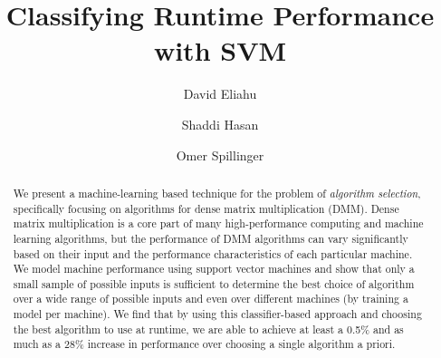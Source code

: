 \documentclass[10pt]{article}
\title{Classifying Runtime Performance with SVM}
\author{David Eliahu \and Shaddi Hasan \and Omer Spillinger}
\begin{document}
\maketitle

\begin{abstract}
    We present a machine-learning based technique for the problem of \emph{algorithm selection}, specifically focusing on algorithms for dense matrix multiplication (DMM).
    Dense matrix multiplication is a core part of many high-performance computing and machine learning algorithms, but the performance of DMM algorithms can vary significantly based on their input and the performance characteristics of each particular machine.
    We model machine performance using support vector machines and show that only a small sample of possible inputs is sufficient to determine the best choice of algorithm over a wide range of possible inputs and even over different machines (by training a model per machine).
    We find that by using this classifier-based approach and choosing the best algorithm to use at runtime, we are able to achieve at least a 0.5\% and as much as a 28\% increase in performance over choosing a single algorithm a priori.
\end{abstract}











\end{document}
